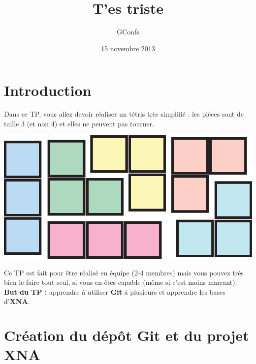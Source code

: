 \documentclass[a4paper]{article}
\title{T'es triste}
\author{
    GConfs
}
\date{15 novembre 2013}
\begin{document}
\color{foreground}

%
\begin{center}
\end{center}

\section*{Introduction}

Dans ce TP, vous allez devoir réaliser un tétris très simplifié : les pièces
sont de taille 3 (et non 4) et elles ne peuvent pas tourner. \\

\begin{center}
    \includegraphics[scale=0.5]{img/pieces.eps}
\end{center}

Ce TP est fait pour être réalisé en équipe (2-4 membres) mais vous pouvez très
bien le faire tout seul, si vous en êtes capable (même si c'est moins marrant).
\\

\textbf{But du TP :} apprendre à utiliser \textbf{Git} à plusieurs et apprendre
les bases d'\textbf{XNA}.

\tableofcontents

\section{Création du dépôt Git et du projet XNA}
\end{document}
